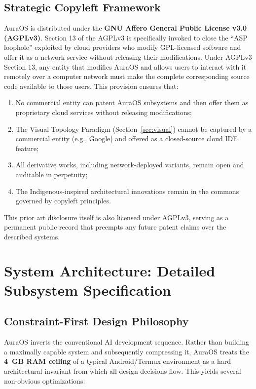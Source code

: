 \documentclass[11pt]{article}
\begin{document}
\subsection{Strategic Copyleft Framework}

AuraOS is distributed under the \textbf{GNU Affero General Public License v3.0 (AGPLv3)}. Section 13 of the AGPLv3 is specifically invoked to close the ``ASP loophole'' exploited by cloud providers who modify GPL-licensed software and offer it as a network service without releasing their modifications. Under AGPLv3 Section 13, any entity that modifies AuraOS and allows users to interact with it remotely over a computer network must make the complete corresponding source code available to those users. This provision ensures that:

\begin{enumerate}[label=(\roman*)]
    \item No commercial entity can patent AuraOS subsystems and then offer them as proprietary cloud services without releasing modifications;
    \item The Visual Topology Paradigm (Section~\ref{sec:visual}) cannot be captured by a commercial entity (e.g., Google) and offered as a closed-source cloud IDE feature;
    \item All derivative works, including network-deployed variants, remain open and auditable in perpetuity;
    \item The Indigenous-inspired architectural innovations remain in the commons governed by copyleft principles.
\end{enumerate}

This prior art disclosure itself is also licensed under AGPLv3, serving as a permanent public record that preempts any future patent claims over the described systems.

\section{System Architecture: Detailed Subsystem Specification}

\subsection{Constraint-First Design Philosophy}

AuraOS inverts the conventional AI development sequence. Rather than building a maximally capable system and subsequently compressing it, AuraOS treats the \textbf{4~GB RAM ceiling} of a typical Android/Termux environment as a hard architectural invariant from which all design decisions flow. This yields several non-obvious optimizations:
\end{document}

